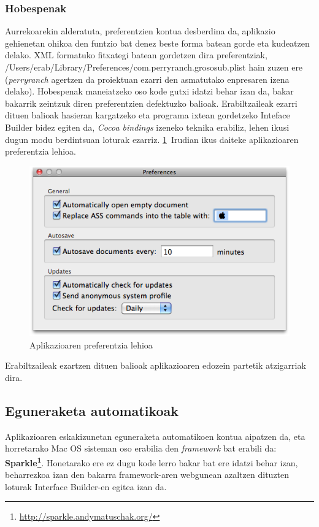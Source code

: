 \subsubsection{Hobespenak}
Aurrekoarekin alderatuta, preferentzien kontua desberdina da, aplikazio gehienetan ohikoa den funtzio bat denez beste forma batean gorde eta kudeatzen delako. XML formatuko fitxategi batean gordetzen dira preferentziak, /Users/erab/Library/Preferences/com.perryranch.grososub.plist hain zuzen ere (\textit{perryranch} agertzen da proiektuan ezarri den asmatutako enpresaren izena delako). Hobespenak maneiatzeko oso kode gutxi idatzi behar izan da, bakar bakarrik zeintzuk diren preferentzien defektuzko balioak. Erabiltzaileak ezarri dituen balioak hasieran kargatzeko eta programa ixtean gordetzeko Inteface Builder bidez egiten da, \textit{Cocoa bindings} izeneko teknika erabiliz, lehen ikusi dugun modu berdintsuan loturak ezarriz. \ref{prefs}~Irudian ikus daiteke aplikazioaren preferentzia lehioa.
\begin{figure}[htp]
\begin{center}
\includegraphics[scale=0.6]{Pictures/Chapter4/Inplementazioa/prefs.png}
\caption{Aplikazioaren preferentzia lehioa}
\label{prefs}
\end{center}
\end{figure}

Erabiltzaileak ezartzen dituen balioak aplikazioaren edozein partetik atzigarriak dira.

\subsection{Eguneraketa automatikoak}
Aplikazioaren eskakizunetan eguneraketa automatikoen kontua aipatzen da, eta horretarako Mac OS sisteman oso erabilia den \textit{framework} bat erabili da: \textbf{Sparkle\footnote{\url{http://sparkle.andymatuschak.org/}}}. Honetarako ere ez dugu kode lerro bakar bat ere idatzi behar izan, beharrezkoa izan den bakarra framework-aren webgunean azaltzen dituzten loturak Interface Builder-en egitea izan da.

